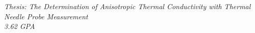     \textit{Thesis: The Determination of Anisotropic Thermal Conductivity with Thermal Needle Probe Measurement}\\
    \emph{ 3.62 GPA}\\

